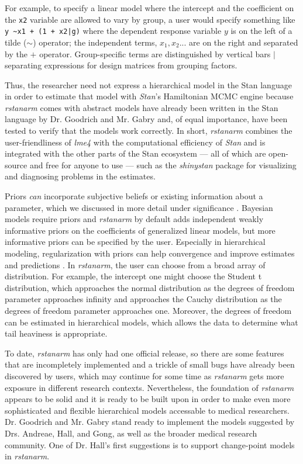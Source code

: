 \documentclass[11pt,notitlepage]{article}
\begin{document}
For example, to specify a linear model where the intercept and the coefficient on the \texttt{x2} 
variable are allowed to vary by group, a user would specify something like \texttt{y \textasciitilde x1 + (1 + x2|g)}
where the dependent response variable $y$ is on the left of a tilde ($\sim$) operator; 
the independent terms, $x_1, x_2...$ are on the right and separated by the $+$ 
operator. Group-specific terms are distinguished by vertical bars $|$ separating expressions for design matrices from grouping factors.

Thus, the researcher need not express a hierarchical model in the Stan language in order to estimate that model with \textit{Stan}'s Hamiltonian
MCMC engine because \textit{rstanarm} comes with abstract models have already been written in the Stan language by 
Dr. Goodrich and Mr. Gabry and, of equal importance, have been tested to verify that the models work correctly. In short, 
\textit{rstanarm} combines the user-friendliness of \textit{lme4} with the 
computational efficiency of \textit{Stan} and is integrated with the other parts of the Stan ecosystem
--- all of which are open-source and free for anyone to use --- such as the \textit{shinystan} package for 
visualizing and diagnosing problems in the estimates.

Priors \textit{can} incorporate subjective beliefs or existing information about a parameter,  
which we discussed in more detail under significance \cite{carlin1997bayes}. 
Bayesian models require priors and \textit{rstanarm} by default 
adds independent weakly informative priors on the coefficients of generalized linear models, 
but more informative priors can be specified by the user. Especially in hierarchical modeling, 
regularization with priors can help convergence and improve estimates and predictions
\cite{Gelman-Hill_2014}. In \textit{rstanarm}, the user can choose from 
a broad array of distribution. For example, the intercept one might choose the 
Student t distribution, which approaches the normal distribution as the 
degrees of freedom parameter approaches infinity and approaches the Cauchy distribution as the
degrees of freedom parameter approaches one. Moreover, the degrees of freedom can be estimated
in hierarchical models, which allows the data to determine what tail heaviness is appropriate.

To date, \textit{rstanarm} has only had one official release, so there are some features that are 
incompletely implemented and a trickle of small bugs have already been discovered by users, which 
may continue for some time as \textit{rstanarm} gets more exposure in different research contexts.
Nevertheless, the foundation of \textit{rstanarm} appears to be solid and it is ready to be built
upon in order to make even more sophisticated and flexible hierarchical models accessable to medical researchers.
Dr. Goodrich and Mr. Gabry stand ready to implement the models suggested by Drs. Andreae, Hall, and 
Gong, as well as the broader medical research community. One of Dr. Hall's first suggestions is to
support change-point models in \textit{rstanarm}.
\end{document}
